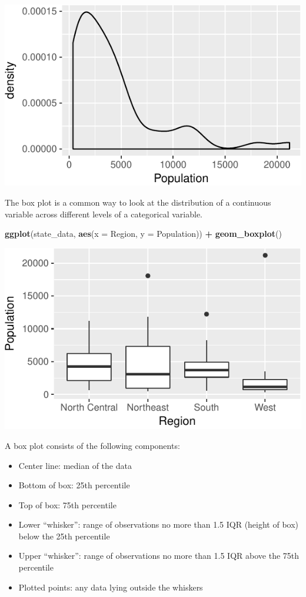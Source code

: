 \documentclass[12pt,oneside,openany]{book}
\newenvironment{Shaded}{\begin{snugshade}}{\end{snugshade}}
\newcommand{\KeywordTok}[1]{\textcolor[rgb]{0.13,0.29,0.53}{\textbf{#1}}}
\newcommand{\DataTypeTok}[1]{\textcolor[rgb]{0.13,0.29,0.53}{#1}}
\newcommand{\StringTok}[1]{\textcolor[rgb]{0.31,0.60,0.02}{#1}}
\newcommand{\OperatorTok}[1]{\textcolor[rgb]{0.81,0.36,0.00}{\textbf{#1}}}
\newcommand{\NormalTok}[1]{#1}
\providecommand{\tightlist}{%
  \setlength{\itemsep}{0pt}\setlength{\parskip}{0pt}}
\begin{document}
\includegraphics{pdaps_files/figure-latex/density-1.pdf}

The box plot is a common way to look at the distribution of a continuous
variable across different levels of a categorical variable.

\begin{Shaded}
\begin{Highlighting}[]
\KeywordTok{ggplot}\NormalTok{(state_data, }\KeywordTok{aes}\NormalTok{(}\DataTypeTok{x =}\NormalTok{ Region, }\DataTypeTok{y =}\NormalTok{ Population)) }\OperatorTok{+}
\StringTok{  }\KeywordTok{geom_boxplot}\NormalTok{()}
\end{Highlighting}
\end{Shaded}

\includegraphics{pdaps_files/figure-latex/boxplot-1.pdf}

A box plot consists of the following components:

\begin{itemize}
\tightlist
\item
  Center line: median of the data
\item
  Bottom of box: 25th percentile
\item
  Top of box: 75th percentile
\item
  Lower ``whisker'': range of observations no more than 1.5 IQR (height
  of box) below the 25th percentile
\item
  Upper ``whisker'': range of observations no more than 1.5 IQR above
  the 75th percentile
\item
  Plotted points: any data lying outside the whiskers
\end{itemize}
\end{document}
